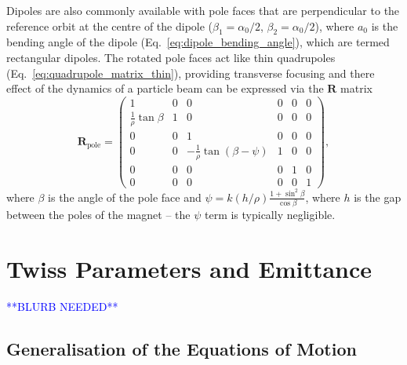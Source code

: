 \documentclass[../main.tex]{subfiles}
\begin{document}
Dipoles are also commonly available with pole faces that are perpendicular to the reference orbit at the centre of the dipole ($\beta_{1}=\alpha_{0}/2$, $\beta_{2}=\alpha_{0}/2$), where $a_{0}$ is the bending angle of the dipole (Eq.~\ref{eq:dipole_bending_angle}), which are termed rectangular dipoles. The rotated pole faces act like thin quadrupoles (Eq.~\ref{eq:quadrupole_matrix_thin}), providing transverse focusing and there effect of the dynamics of a particle beam can be expressed via the $\boldsymbol{R}$ matrix
\begin{equation}
\boldsymbol{R}_{\mathrm{pole}} =
\begin{pmatrix}
1 & 0 & 0 & 0 & 0 & 0 \\
\frac{1}{\rho}\tan\beta & 1 & 0 & 0 & 0 & 0 \\
0 & 0 & 1 & 0 & 0 & 0 \\
0 & 0 & -\frac{1}{\rho}\tan\left(\beta-\psi\right) & 1 & 0 & 0 \\
0 & 0 & 0 & 0 & 1 & 0 \\
0 & 0 & 0 & 0 & 0 & 1
\end{pmatrix},
\label{eq:pole_face_matrix}    
\end{equation}
where $\beta$ is the angle of the pole face and $\psi = k\left(h/\rho\right)\frac{1+\sin^{2}\beta}{\cos\beta}$, where $h$ is the gap between the poles of the magnet -- the $\psi$ term is typically negligible. 

\section{Twiss Parameters and Emittance}
\textcolor{blue}{**BLURB NEEDED**\\}

\subsection{Generalisation of the Equations of Motion}
\end{document}
